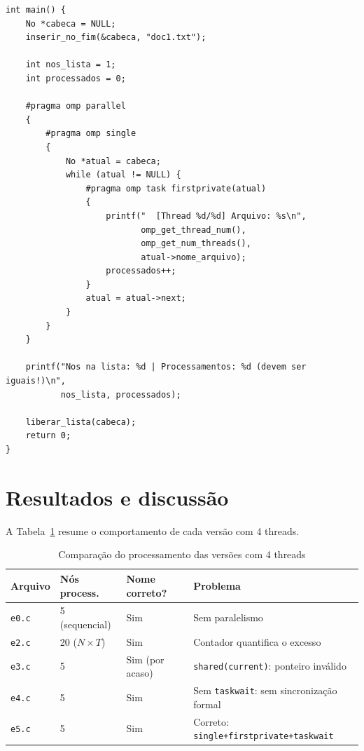 \documentclass[11pt,letterpaper]{article}
\begin{document}
\begin{lstlisting}[caption={main() de e5.c, versão correta}]
int main() {
    No *cabeca = NULL;
    inserir_no_fim(&cabeca, "doc1.txt");

    int nos_lista = 1;
    int processados = 0;

    #pragma omp parallel
    {
        #pragma omp single
        {
            No *atual = cabeca;
            while (atual != NULL) {
                #pragma omp task firstprivate(atual)
                {
                    printf("  [Thread %d/%d] Arquivo: %s\n",
                           omp_get_thread_num(),
                           omp_get_num_threads(),
                           atual->nome_arquivo);
                    processados++;
                }
                atual = atual->next;
            }
        }
    }

    printf("Nos na lista: %d | Processamentos: %d (devem ser iguais!)\n",
           nos_lista, processados);

    liberar_lista(cabeca);
    return 0;
}
\end{lstlisting}

\newpage
\section{Resultados e discussão}

A Tabela~\ref{tab:comparacao} resume o comportamento de cada versão com 4 threads.

\begin{table}[H]
\centering
\caption{Comparação do processamento das versões com 4 threads}
\label{tab:comparacao}
\begin{tabular}{llll}
\hline
\textbf{Arquivo} & \textbf{Nós process.} & \textbf{Nome correto?} & \textbf{Problema} \\ \hline
\texttt{e0.c} & 5 (sequencial) & Sim & Sem paralelismo \\
\texttt{e2.c} & 20 ($N\times T$) & Sim & Contador quantifica o excesso \\
\texttt{e3.c} & 5 & Sim (por acaso) & \texttt{shared(current)}: ponteiro inválido \\
\texttt{e4.c} & 5 & Sim & Sem \texttt{taskwait}: sem sincronização formal \\
\texttt{e5.c} & 5 & Sim & Correto: \texttt{single+firstprivate+taskwait} \\ \hline
\end{tabular}
\end{table}
\end{document}
